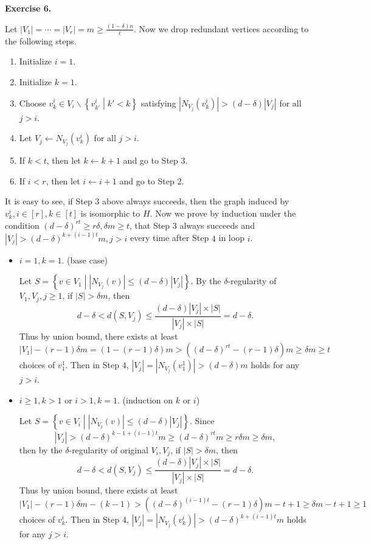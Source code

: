 \documentclass[a4paper]{article}
\newenvironment{exercise}[1]{
	\par
	\noindent\textbf{Exercise #1.}\quad
}{
	\par
	\bigskip
}
\newcommand{\abs}[1]{\left| #1 \right|}
\newcommand{\pbra}[1]{\left( #1 \right)}
\newcommand{\cbra}[1]{\left\{ #1 \right\}}
\begin{document}
\begin{exercise}{6}
    Let $|V_1|=\cdots=|V_r|=m\geq\frac{(1-\delta)n}\ell$. Now we drop redundant vertices according to the following steps.
    \begin{enumerate}
        \item Initialize $i=1$.
        \item Initialize $k=1$.
        \item Choose $v^i_k\in V_i\backslash\cbra{v_{k'}^i\middle|k'<k}$ 
            satisfying $\abs{N_{V_j}(v^i_k)}>(d-\delta)|V_j|$ for all $j>i$.
        \item Let $V_j\gets N_{V_j}(v^i_k)$ for all $j>i$.
        \item If $k<t$, then let $k\gets k+1$ and go to Step $3$.
        \item If $i<r$, then let $i\gets i+1$ and go to Step $2$.
    \end{enumerate}
    It is easy to see, if Step $3$ above always succeeds, then the graph induced by $v_k^i,i\in[r],k\in[t]$ is isomorphic to $H$.
    Now we prove by induction under the condition $(d-\delta)^{rt}\geq r\delta,\delta m\geq t$, that Step $3$ always succeeds and 
    $|V_j|>(d-\delta)^{k+(i-1)t}m,j>i$ every time after Step $4$ in loop $i$.
    \begin{itemize}
        \item $i=1,k=1.$ (base case) 
            
            Let $S=\cbra{v\in V_1\middle|\abs{N_{V_j}(v)}\leq(d-\delta)|V_j|}$.
            By the $\delta$-regularity of $V_1,V_j,j\geq1$, if $|S|>\delta m$, then 
            $$
            d-\delta<d(S,V_j)\leq\frac{(d-\delta)|V_j|\times|S|}{|V_j|\times|S|}=d-\delta.
            $$
            Thus by union bound, there exists at least 
            $$
            |V_1|-(r-1)\delta m=(1-(r-1)\delta)m>\pbra{(d-\delta)^{rt}-(r-1)\delta}m\geq\delta m\geq t
            $$
            choices of $v_1^1$. Then in Step $4$, $|V_j|=|N_{V_j}(v_1^1)|>(d-\delta)m$ holds for any $j>i$.
        \item $i\geq1,k>1$ or $i>1,k=1.$ (induction on $k$ or $i$) 
            
            Let $S=\cbra{v\in V_i\middle|\abs{N_{V_j}(v)}\leq(d-\delta)|V_j|}$. Since 
            $$
            |V_j|>(d-\delta)^{k-1+(i-1)t}m\geq(d-\delta)^{rt}m\geq r\delta m\geq\delta m,
            $$
            then by the $\delta$-regularity of original $V_i,V_j$, if $|S|>\delta m$, then
            $$
            d-\delta<d(S,V_j)\leq\frac{(d-\delta)|V_j|\times|S|}{|V_j|\times|S|}=d-\delta.
            $$
            Thus by union bound, there exists at least 
            $$
            |V_1|-(r-1)\delta m-(k-1)>\pbra{(d-\delta)^{(i-1)t}-(r-1)\delta}m-t+1\geq\delta m-t+1\geq 1
            $$
            choices of $v_k^i$. Then in Step $4$, $|V_j|=\abs{N_{V_j}(v_k^i)}>(d-\delta)^{k+(i-1)t}m$ holds for any $j>i$.
    \end{itemize}


\end{exercise}
\end{document}
